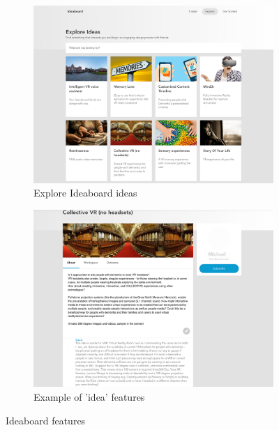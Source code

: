 \begin{figure}
\centering
\begin{subfigure}{.5\textwidth}
  \centering
  \includegraphics[width=.8\linewidth]{Images/DemVR/Ideaboard Ideas.png}
  \caption{Explore Ideaboard ideas}
  \label{fig:exploreIdeaboard}
\end{subfigure}%
\begin{subfigure}{.5\textwidth}
  \centering
  \includegraphics[width=.8\linewidth]{Images/DemVR/Example of idea.png}
  \caption{Example of 'idea' features}
  \label{fig:IdeaboardIdea}
\end{subfigure}
\caption{Ideaboard features}
\label{fig:IdeaboardFeatures}
\end{figure}

